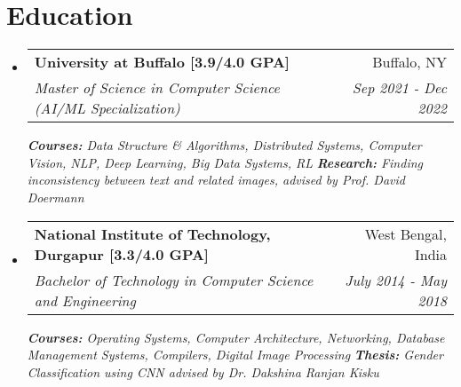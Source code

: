 \documentclass[a4paper,20pt]{article}
\makeatletter
\newcommand{\resumeSubheading}[4]{
  \vspace{-1pt}\item
    \begin{tabular*}{0.97\textwidth}{l@{\extracolsep{\fill}}r}
      \textbf{#1} & #2 \\
      \textit{#3} & \textit{#4} \\
    \end{tabular*}\vspace{-5pt}
}
\newcommand{\resumeSubHeadingListStart}{\begin{itemize}[leftmargin=*]}
\newcommand{\resumeSubHeadingListEnd}{\end{itemize}}
\makeatother
\begin{document}
\section{Education}
  \resumeSubHeadingListStart
    \resumeSubheading
      {University at Buffalo [3.9/4.0 GPA] }{Buffalo, NY}
      {Master of Science in Computer Science (AI/ML Specialization)}{Sep 2021 - Dec 2022}
      {\scriptsize \textit{ \footnotesize{\newline{}\textbf{Courses:} Data Structure \& Algorithms, Distributed Systems, Computer Vision, NLP, Deep Learning, Big Data Systems, RL}}}
      {\scriptsize \textit{ \footnotesize{\newline{}\textbf{Research:} Finding inconsistency between text and related images, advised by Prof. David Doermann}}}
    \resumeSubHeadingListEnd
    
    \resumeSubHeadingListStart
    \resumeSubheading
      {National Institute of Technology, Durgapur [3.3/4.0 GPA]}{West Bengal, India}
      {Bachelor of Technology in Computer Science and Engineering}{July 2014 - May 2018}
      {\scriptsize \textit{ \footnotesize{\newline{}\textbf{Courses:} Operating Systems, Computer Architecture, Networking, Database Management Systems, Compilers, Digital Image Processing}}}
      {\scriptsize \textit{ \footnotesize{\newline{}\textbf{Thesis:} Gender Classification using CNN advised by Dr. Dakshina Ranjan Kisku}}}
    \resumeSubHeadingListEnd
	    
\vspace{-8pt}
\end{document}
